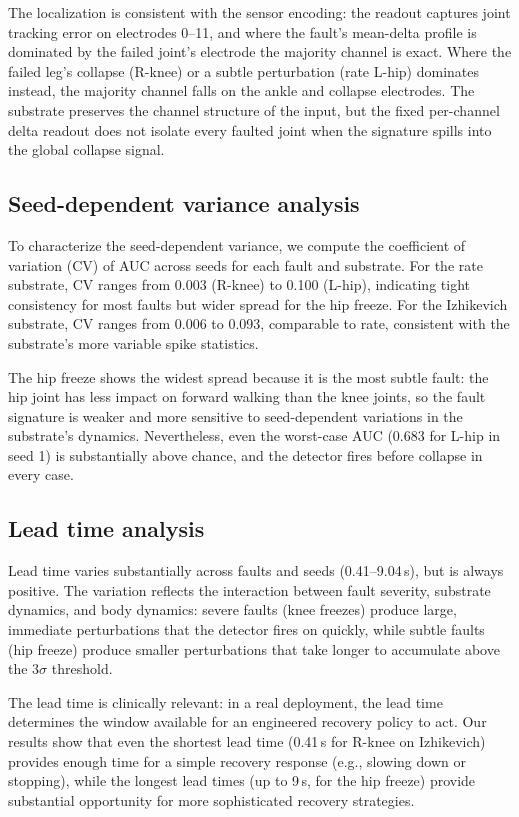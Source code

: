 The localization is consistent with the sensor encoding: the readout captures
joint tracking error on electrodes 0--11, and where the fault's mean-delta
profile is dominated by the failed joint's electrode the majority channel is
exact. Where the failed leg's collapse (R-knee) or a subtle perturbation
(rate L-hip) dominates instead, the majority channel falls on the ankle and
collapse electrodes. The substrate preserves the channel structure of the
input, but the fixed per-channel delta readout does not isolate every faulted
joint when the signature spills into the global collapse signal.

\subsection{Seed-dependent variance analysis}

To characterize the seed-dependent variance, we compute the coefficient of
variation (CV) of AUC across seeds for each fault and substrate. For the rate
substrate, CV ranges from 0.003 (R-knee) to 0.100 (L-hip), indicating tight
consistency for most faults but wider spread for the hip freeze. For the
Izhikevich substrate, CV ranges from 0.006 to 0.093, comparable to rate,
consistent with the substrate's more variable spike statistics.

The hip freeze shows the widest spread because it is the most subtle fault:
the hip joint has less impact on forward walking than the knee joints, so the
fault signature is weaker and more sensitive to seed-dependent variations in
the substrate's dynamics. Nevertheless, even the worst-case AUC (0.683 for
L-hip in seed 1) is substantially above chance, and the detector fires before
collapse in every case.

\subsection{Lead time analysis}

Lead time varies substantially across faults and seeds (0.41--9.04\,s), but is
always positive. The variation reflects the interaction between fault severity,
substrate dynamics, and body dynamics: severe faults (knee freezes) produce
large, immediate perturbations that the detector fires on quickly, while
subtle faults (hip freeze) produce smaller perturbations that take longer to
accumulate above the $3\sigma$ threshold.

The lead time is clinically relevant: in a real deployment, the lead time
determines the window available for an engineered recovery policy to act.
Our results show that even the shortest lead time (0.41\,s for R-knee on
Izhikevich) provides enough time for a simple recovery response (e.g., slowing
down or stopping), while the longest lead times (up to 9\,s, for the hip
freeze) provide substantial opportunity for more sophisticated recovery
strategies.

